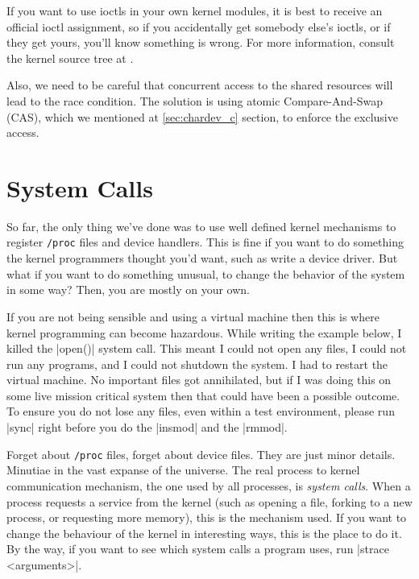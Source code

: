 \documentclass[10pt, oneside]{book}
\begin{document}
If you want to use ioctls in your own kernel modules, it is best to receive an official ioctl assignment, so if you accidentally get somebody else's ioctls, or if they get yours, you'll know something is wrong.
For more information, consult the kernel source tree at .

Also, we need to be careful that concurrent access to the shared resources will lead to the race condition.
The solution is using atomic Compare-And-Swap (CAS), which we mentioned at \ref{sec:chardev_c} section, to enforce the exclusive access.




\section{System Calls}
\label{sec:syscall}
So far, the only thing we've done was to use well defined kernel mechanisms to register \verb|/proc| files and device handlers.
This is fine if you want to do something the kernel programmers thought you'd want, such as write a device driver.
But what if you want to do something unusual, to change the behavior of the system in some way?
Then, you are mostly on your own.

If you are not being sensible and using a virtual machine then this is where kernel programming can become hazardous.
While writing the example below, I killed the \cpp|open()| system call.
This meant I could not open any files, I could not run any programs, and I could not shutdown the system.
I had to restart the virtual machine.
No important files got annihilated, but if I was doing this on some live mission critical system then that could have been a possible outcome.
To ensure you do not lose any files, even within a test environment, please run \sh|sync| right before you do the \sh|insmod| and the \sh|rmmod|.

Forget about \verb|/proc| files, forget about device files.
They are just minor details.
Minutiae in the vast expanse of the universe.
The real process to kernel communication mechanism, the one used by all processes, is \emph{system calls}.
When a process requests a service from the kernel (such as opening a file, forking to a new process, or requesting more memory), this is the mechanism used.
If you want to change the behaviour of the kernel in interesting ways, this is the place to do it.
By the way, if you want to see which system calls a program uses, run \sh|strace <arguments>|.
\end{document}
